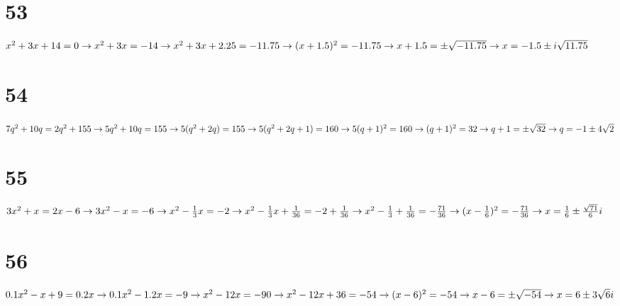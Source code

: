 \documentclass{article}
\theoremstyle{definition}
\begin{document}
\section*{53}
$x^2+3x+14=0\newline\rightarrow x^2+3x=-14\newline\rightarrow x^2+3x+2.25=-11.75\newline\rightarrow (x+1.5)^2=-11.75\newline\rightarrow 
x+1.5=\pm\sqrt{-11.75}\newline\rightarrow x=-1.5\pm i\sqrt{11.75}$

\section*{54}
$7q^2+10q=2q^2+155\newline\rightarrow 5q^2+10q=155\newline\rightarrow 5(q^2+2q)=155\newline\rightarrow 5(q^2+2q+1)=160\newline\rightarrow 
5(q+1)^2=160\newline\rightarrow (q+1)^2=32\newline\rightarrow q+1=\pm\sqrt{32}\newline\rightarrow q=-1\pm 4\sqrt{2}$

\section*{55}
$3x^2+x=2x-6\newline\rightarrow 3x^2-x=-6\newline\rightarrow x^2-\frac{1}{3}x=-2\newline\rightarrow x^2-\frac{1}{3}x+\frac{1}{36}=-2+\frac{1}{36}\newline
\rightarrow x^2-\frac{1}{3}+\frac{1}{36}=-\frac{71}{36}\newline\rightarrow (x-\frac{1}{6})^2=-\frac{71}{36}\newline\rightarrow x=\frac{1}{6}\pm \frac{
\sqrt{71}}{6}i$

\section*{56}
$0.1x^2-x+9=0.2x\newline\rightarrow 0.1x^2-1.2x=-9\newline\rightarrow x^2-12x=-90\newline\rightarrow x^2-12x+36=-54\newline\rightarrow 
(x-6)^2=-54\newline\rightarrow x-6=\pm\sqrt{-54}\newline\rightarrow x=6\pm 3\sqrt{6}i$
\end{document}

